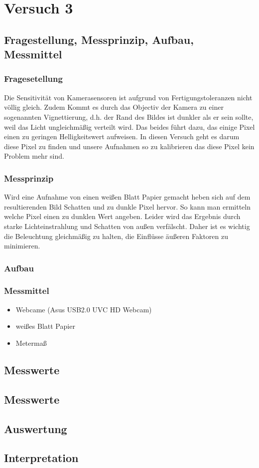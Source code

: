 \chapter{Versuch 3}
\label{chap:VERSUCH_3}

\section{Fragestellung, Messprinzip, Aufbau, Messmittel}
\label{chap:VERSUCH_3_FRAGESTELLUNG}

\subsection*{Fragesetellung}

Die Sensitivität von Kamerasensoren ist aufgrund von Fertigungstoleranzen nicht völlig gleich.
Zudem Kommt es durch das Objectiv der Kamera zu einer sogenannten Vignettierung, d.h. der Rand des Bildes ist dunkler als er sein sollte, weil das Licht ungleichmäßig verteilt wird.
Das beides führt dazu, das einige Pixel einen zu geringen Helligkeitswert aufweisen.
In diesen Versuch geht es darum diese Pixel zu finden und unsere Aufnahmen so zu kalibrieren das diese Pixel kein Problem mehr sind.

\subsection*{Messprinzip}
Wird eine Aufnahme von einen weißen Blatt Papier gemacht heben sich auf dem resultierenden Bild Schatten und zu dunkle Pixel hervor.
So kann man ermitteln welche Pixel einen zu dunklen Wert angeben.
Leider wird das Ergebnis durch starke Lichteinstrahlung und Schatten von außen verfälscht.
Daher ist es wichtig die Beleuchtung gleichmäßig zu halten, die Einflüsse äußeren Faktoren zu minimieren.

\subsection*{Aufbau}

\subsection{Messmittel}
\begin{itemize}
\item Webcame (Asus USB2.0 UVC HD Webcam)
\item weißes Blatt Papier
\item Metermaß
\end{itemize}



\section{Messwerte}
\label{chap:VERSUCH_1_MESSWERTE}
\section{Messwerte}
\label{chap:VERSUCH_3_MESSWERTE}

\section{Auswertung}
\label{chap:VERSUCH_3_AUSWERTUNG}

\section{Interpretation}
\label{chap:VERSUCH_3_INTERPRETATION}
